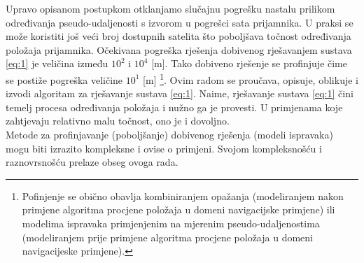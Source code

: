 \documentclass[a4paper,twoside,12pt]{memoir} %
\begin{document}
	Upravo opisanom postupkom otklanjamo slučajnu pogrešku nastalu prilikom 
	određivanja pseudo-udaljenosti 
	s izvorom u pogrešci sata prijamnika.
	U praksi se može koristiti još veći broj dostupnih satelita što poboljšava 
	točnost određivanja položaja prijamnika. Očekivana pogreška rješenja dobivenog rješavanjem sustava \ref{eq:1} je veličina između $10^2$ i $10^4$ [m]. Tako dobiveno rješenje se profinjuje čime se postiže pogreška veličine $10^1$ [m] \footnote{Pofinjenje se obično obavlja kombiniranjem opažanja (modeliranjem nakon primjene algoritma procjene položaja u domeni navigacijske primjene) ili modelima ispravaka primjenjenim na mjerenim pseudo-udaljenostima (modeliranjem prije primjene algoritma procjene položaja u domeni navigacijeske primjene).}.
	Ovim radom se proučava, opisuje, oblikuje i izvodi algoritam za rješavanje sustava \ref{eq:1}.
	Naime, rješavanje sustava \ref{eq:1} čini temelj procesa određivanja položaja i nužno ga je provesti.
	U primjenama koje zahtjevaju relativno malu točnost, ono je i dovoljno.\\
	Metode za profinjavanje (poboljšanje) dobivenog rješenja (modeli ispravaka) mogu biti izrazito kompleksne i ovise o primjeni. Svojom kompleksnošću i raznovrsnošću prelaze obseg ovoga rada.\\
\end{document}
